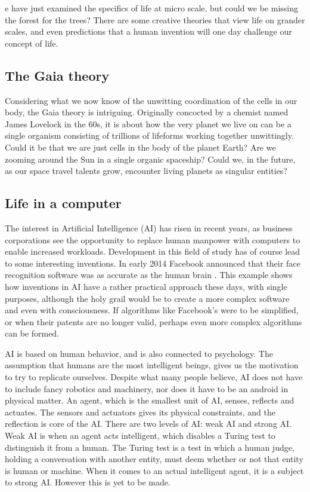 e have just examined the specifics of life at micro scale, but could we be missing the forest for the trees?
There are some creative theories that view life on grander scales, and even predictions that a human invention will one day challenge our concept of life.

\subsection{The Gaia theory}
Considering what we now know of the unwitting coordination of the cells in our body, the Gaia theory is intriguing.
Originally concocted by a chemist named James Lovelock\cite{Lovelock} in the 60s, it is about how the very planet we live on can be a single organism consisting of trillions of lifeforms working together unwittingly.
Could it be that we are just cells in the body of the planet Earth?
Are we zooming around the Sun in a single organic spaceship?
Could we, in the future, as our space travel talents grow, encounter living planets as singular entities?

\subsection{Life in a computer}
The interest in Artificial Intelligence (AI) has risen in recent years, as business corporations see the opportunity to replace human manpower with computers to enable increased workloads.
Development in this field of study has of course lead to some interesting inventions.
In early 2014 Facebook announced that their face recognition software was as accurate as the human brain \cite{facebook}.
This example shows how inventions in AI have a rather practical approach these days, with single purposes, although the holy grail would be to create a more complex software and even with consciousness.
If algorithms like Facebook's were to be simplified, or when their patents are no longer valid, perhaps even more complex algorithms can be formed.

AI is based on human behavior, and is also connected to psychology.
The assumption that humans are the most intelligent beings, gives us the motivation to try to replicate ourselves.
Despite what many people believe, AI does not have to include fancy robotics and machinery, nor does it have to be an android in physical matter.
An agent, which is the smallest unit of AI, senses, reflects and actuates.
The sensors and actuators gives its physical constraints, and the reflection is core of the AI.
There are two levels of AI: weak AI and strong AI.
Weak AI is when an agent acts intelligent, which disables a Turing test to distinguish it from a human.
The Turing test is a test in which a human judge, holding a conversation with another entity, must deem whether or not that entity is human or machine. 
When it comes to an actual intelligent agent, it is a subject to strong AI.
However this is yet to be made.